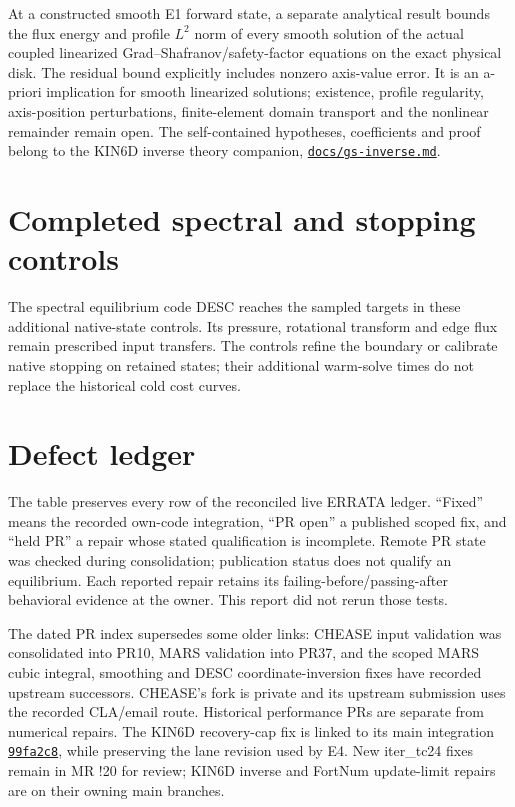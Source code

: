 \documentclass[10pt,a4paper]{article}
\newcommand{\kincommit}[2]{\href{https://github.com/itpplasma/kin6d/commit/#1}{#2}}
\newcommand{\pageheading}[1]{\clearpage\section{#1}}
\begin{document}
At a constructed smooth E1 forward state, a separate analytical result
bounds the flux energy and profile $L^2$ norm of every smooth solution of the actual coupled linearized
Grad--Shafranov/safety-factor equations on the exact physical disk.
The residual bound explicitly includes nonzero axis-value error.
It is an a-priori implication for smooth linearized solutions; existence,
profile regularity, axis-position perturbations, finite-element domain
transport and the nonlinear remainder remain open.
The self-contained hypotheses, coefficients and proof belong to the KIN6D
inverse theory companion, \href{https://github.com/itpplasma/kin6d/blob/648e544/docs/gs-inverse.md}{\texttt{docs/gs-inverse.md}}.

\pageheading{Completed spectral and stopping controls}
The spectral equilibrium code DESC reaches the sampled targets in these
additional native-state controls. Its pressure, rotational transform and
edge flux remain prescribed input transfers. The controls refine the
boundary or calibrate native stopping on retained states; their additional
warm-solve times do not replace the historical cold cost curves.
\begin{center}\small

\end{center}



\pageheading{Defect ledger}
The table preserves every row of the reconciled live ERRATA ledger. ``Fixed''
means the recorded own-code integration, ``PR open'' a published scoped fix,
and ``held PR'' a repair whose stated qualification is incomplete. Remote PR state was checked during consolidation; publication status
does not qualify an equilibrium.
Each reported repair retains its failing-before/passing-after behavioral
evidence at the owner. This report did not rerun those tests.

The dated PR index supersedes some older links: CHEASE input validation was
consolidated into PR10, MARS validation into PR37, and the scoped MARS cubic
integral, smoothing and DESC coordinate-inversion fixes have recorded upstream
successors. CHEASE's fork is private and its upstream submission uses the
recorded CLA/email route. Historical performance PRs are separate from numerical
repairs. The KIN6D recovery-cap fix is linked to its main integration
\kincommit{99fa2c8}{\texttt{99fa2c8}}, while preserving the lane revision used
by E4. New iter\_tc24 fixes remain in MR !20 for review; KIN6D inverse and
FortNum update-limit repairs are on their owning main branches.
\end{document}
